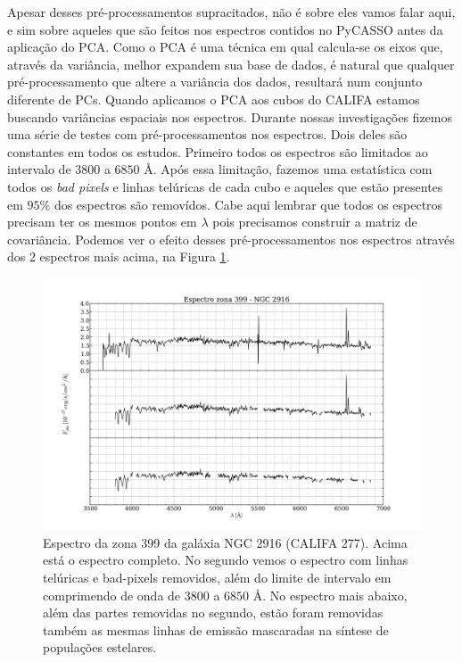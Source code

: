 Apesar desses pré-processamentos supracitados, não é sobre eles vamos falar aqui, e sim sobre aqueles que são feitos nos
espectros contidos no PyCASSO antes da aplicação do PCA. Como o PCA é uma técnica em qual calcula-se os eixos que,
através da variância, melhor expandem sua base de dados, é natural que qualquer pré-processamento que altere a variância
dos dados, resultará num conjunto diferente de PCs. Quando aplicamos o PCA aos cubos do CALIFA estamos buscando
variâncias espaciais nos espectros. Durante nossas investigações fizemos uma série de testes com pré-processamentos nos
espectros. Dois deles são constantes em todos os estudos. Primeiro todos os espectros são limitados ao intervalo de
$3800$ a $6850$ \AA. Após essa limitação, fazemos uma estatística com todos os {\em bad pixels} e linhas telúricas de
cada cubo e aqueles que estão presentes em $95\%$ dos espectros são removídos. Cabe aqui lembrar que todos os espectros
precisam ter os mesmos pontos em $\lambda$ pois precisamos construir a matriz de covariância. Podemos ver o efeito
desses pré-processamentos nos espectros através dos 2 espectros mais acima, na Figura \ref{fig:UsoPCA:checkmask}.

\begin{figure}
    \includegraphics[width=1.0\textwidth]{figuras/K0277-constant_inital_mask-399.pdf}
    \caption[Exemplo de máscaras em um espectro do cubo de dados.]
    {Espectro da zona 399 da galáxia NGC 2916 (CALIFA 277). Acima está o espectro completo. No segundo vemos o espectro
    com linhas telúricas e bad-pixels removidos, além do limite de intervalo em comprimendo de onda de $3800$ a $6850$
    \AA. No espectro mais abaixo, além das partes removidas no segundo, estão foram removidas também as mesmas linhas de
    emissão mascaradas na síntese de populações estelares.}
    \label{fig:UsoPCA:checkmask}
\end{figure}

